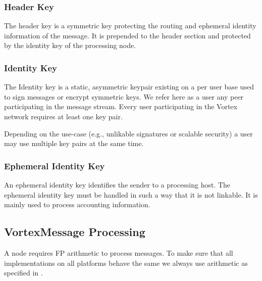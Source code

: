 \subsubsection{Header Key}
The header key is a symmetric key protecting the routing and ephemeral identity information of the message. It is prepended to the header section and protected by the identity key of the processing node.

\subsubsection{Identity Key}
The Identity key is a static, asymmetric keypair existing on a per user base used to sign messages or encrypt symmetric keys. We refer here as a user any peer participating in the message stream. Every user participating in the Vortex network requires at least one key pair. 

Depending on the use-case (e.g., unlikable signatures or scalable security) a user may use multiple key pairs at the same time.

\subsubsection{Ephemeral Identity Key}
An ephemeral identity key identifies the sender to a processing host. The ephemeral identity key must be handled in such a way that it is not linkable. It is mainly used to process accounting information.

\subsection{VortexMessage Processing}
A node requires FP arithmetic to process messages. To make sure that all implementations on all platforms behave the same we always use arithmetic as specified in \cite{IEEE754}.

